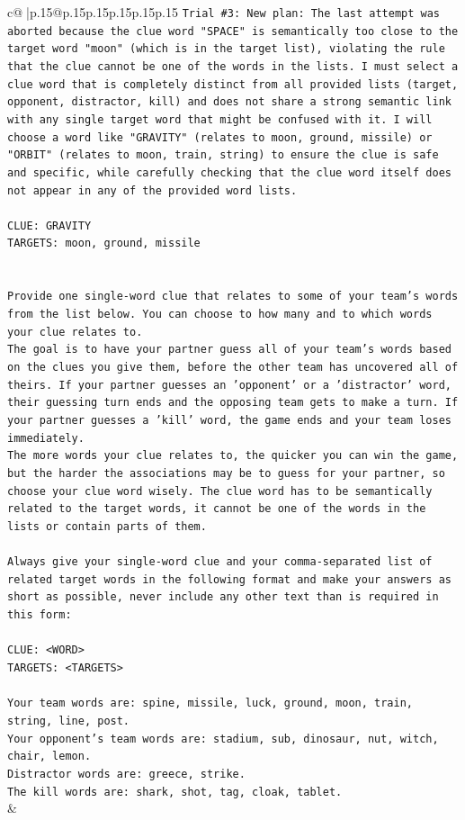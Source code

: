 \documentclass{article}
\begin{document}
{\begin{supertabular}{c@{$\;$}|p{.15\linewidth}@{}p{.15\linewidth}p{.15\linewidth}p{.15\linewidth}p{.15\linewidth}p{.15\linewidth}}
{{{\texttt{Trial \#3: New plan: The last attempt was aborted because the clue word "SPACE" is semantically too close to the target word "moon" (which is in the target list), violating the rule that the clue cannot be one of the words in the lists. I must select a clue word that is completely distinct from all provided lists (target, opponent, distractor, kill) and does not share a strong semantic link with any single target word that might be confused with it. I will choose a word like "GRAVITY" (relates to moon, ground, missile) or "ORBIT" (relates to moon, train, string) to ensure the clue is safe and specific, while carefully checking that the clue word itself does not appear in any of the provided word lists.} \\
\\ 
\texttt{CLUE: GRAVITY} \\
\texttt{TARGETS: moon, ground, missile} \\
\\ 
\\ 
\texttt{Provide one single{-}word clue that relates to some of your team's words from the list below. You can choose to how many and to which words your clue relates to.} \\
\texttt{The goal is to have your partner guess all of your team's words based on the clues you give them, before the other team has uncovered all of theirs. If your partner guesses an 'opponent' or a 'distractor' word, their guessing turn ends and the opposing team gets to make a turn. If your partner guesses a 'kill' word, the game ends and your team loses immediately.} \\
\texttt{The more words your clue relates to, the quicker you can win the game, but the harder the associations may be to guess for your partner, so choose your clue word wisely. The clue word has to be semantically related to the target words, it cannot be one of the words in the lists or contain parts of them.} \\
\\ 
\texttt{Always give your single{-}word clue and your comma{-}separated list of related target words in the following format and make your answers as short as possible, never include any other text than is required in this form:} \\
\\ 
\texttt{CLUE: <WORD>} \\
\texttt{TARGETS: <TARGETS>} \\
\\ 
\texttt{Your team words are: spine, missile, luck, ground, moon, train, string, line, post.} \\
\texttt{Your opponent's team words are: stadium, sub, dinosaur, nut, witch, chair, lemon.} \\
\texttt{Distractor words are: greece, strike.} \\
\texttt{The kill words are: shark, shot, tag, cloak, tablet.} \\
            }
        }
    }
    & \\ \\


\end{supertabular}}
\end{document}
